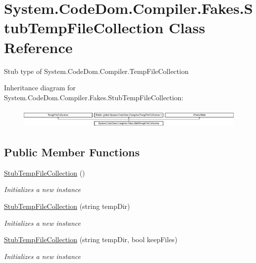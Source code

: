 \hypertarget{class_system_1_1_code_dom_1_1_compiler_1_1_fakes_1_1_stub_temp_file_collection}{\section{System.\-Code\-Dom.\-Compiler.\-Fakes.\-Stub\-Temp\-File\-Collection Class Reference}
\label{class_system_1_1_code_dom_1_1_compiler_1_1_fakes_1_1_stub_temp_file_collection}
}


Stub type of System.\-Code\-Dom.\-Compiler.\-Temp\-File\-Collection 


Inheritance diagram for System.\-Code\-Dom.\-Compiler.\-Fakes.\-Stub\-Temp\-File\-Collection\-:\begin{figure}[H]
\begin{center}
\leavevmode
\includegraphics[height=0.998218cm]{class_system_1_1_code_dom_1_1_compiler_1_1_fakes_1_1_stub_temp_file_collection}
\end{center}
\end{figure}
\subsection*{Public Member Functions}
\begin{DoxyCompactItemize}
\item 
\hyperlink{class_system_1_1_code_dom_1_1_compiler_1_1_fakes_1_1_stub_temp_file_collection_a14259205cf54f4297b580fe41d840be3}{Stub\-Temp\-File\-Collection} ()
\begin{DoxyCompactList}\small\item\em Initializes a new instance\end{DoxyCompactList}\item 
\hyperlink{class_system_1_1_code_dom_1_1_compiler_1_1_fakes_1_1_stub_temp_file_collection_a101172987dc86272db227f7636f15ebe}{Stub\-Temp\-File\-Collection} (string temp\-Dir)
\begin{DoxyCompactList}\small\item\em Initializes a new instance\end{DoxyCompactList}\item 
\hyperlink{class_system_1_1_code_dom_1_1_compiler_1_1_fakes_1_1_stub_temp_file_collection_a140caa3a2695eb5c6953f7bf24d84a99}{Stub\-Temp\-File\-Collection} (string temp\-Dir, bool keep\-Files)
\begin{DoxyCompactList}\small\item\em Initializes a new instance\end{DoxyCompactList}\end{DoxyCompactItemize}

